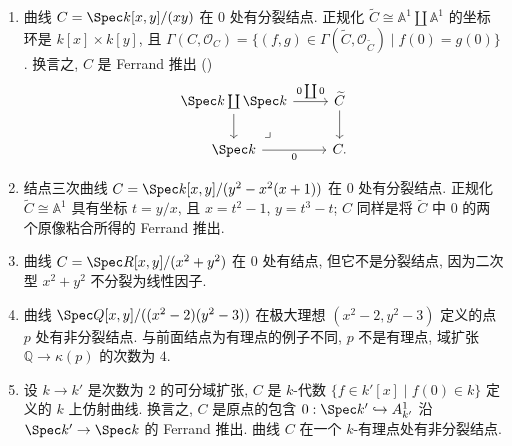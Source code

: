 \begin{example}\label{src:6.2.3}
\begin{enumerate}[(1)]
\item 曲线 $C=\Spec k[x,\allowbreak y]/(xy)$ 在 $0$ 处有分裂结点. 正规化 $\widetilde C\cong\mathbb A^1\coprod\mathbb A^1$ 的坐标环是 $k[x]\times k[y]$, 且 $\Gamma(C,\allowbreak \mathcal O_C)=\{(f,\allowbreak g)\in\Gamma(\widetilde C,\allowbreak \mathcal O_{\widetilde C})\mid f(0)=g(0)\}$. 换言之, $C$ 是 Ferrand 推出 ()
\[
\begin{tikzcd}
\Spec k\coprod\Spec k\arrow[r,"0\coprod0"]\arrow[d]&\widetilde C\arrow[d]\\
\Spec k\arrow[r,"0"']\arrow[ur,phantom,"\lrcorner",very near start]&C.
\end{tikzcd}
\]
\item 结点三次曲线 $C=\Spec k[x,\allowbreak y]/(y^2-x^2(x+1))$ 在 $0$ 处有分裂结点. 正规化 $\widetilde C\cong\mathbb A^1$ 具有坐标 $t=y/x$, 且 $x=t^2-1$, $y=t^3-t$; $C$ 同样是将 $\widetilde C$ 中 $0$ 的两个原像粘合所得的 Ferrand 推出.
\item 曲线 $C=\Spec\mathbb R[x,\allowbreak y]/(x^2+y^2)$ 在 $0$ 处有结点, 但它不是分裂结点, 因为二次型 $x^2+y^2$ 不分裂为线性因子.
\item 曲线 $\Spec\mathbb Q[x,\allowbreak y]/((x^2-2)(y^2-3))$ 在极大理想 $(x^2-2,\allowbreak y^2-3)$ 定义的点 $p$ 处有非分裂结点. 与前面结点为有理点的例子不同, $p$ 不是有理点, 域扩张 $\mathbb Q\to\kappa(p)$ 的次数为 $4$.
\item 设 $k\to\allowbreak k'$ 是次数为 $2$ 的可分域扩张, $C$ 是 $k$-代数 $\{f\in k'[x]\mid f(0)\in k\}$ 定义的 $k$ 上仿射曲线. 换言之, $C$ 是原点的包含 $0:\Spec k'\hookrightarrow\mathbb A_{k'}^1$ 沿 $\Spec k'\to\Spec k$ 的 Ferrand 推出. 曲线 $C$ 在一个 $k$-有理点处有非分裂结点.
\end{enumerate}
\end{example}
